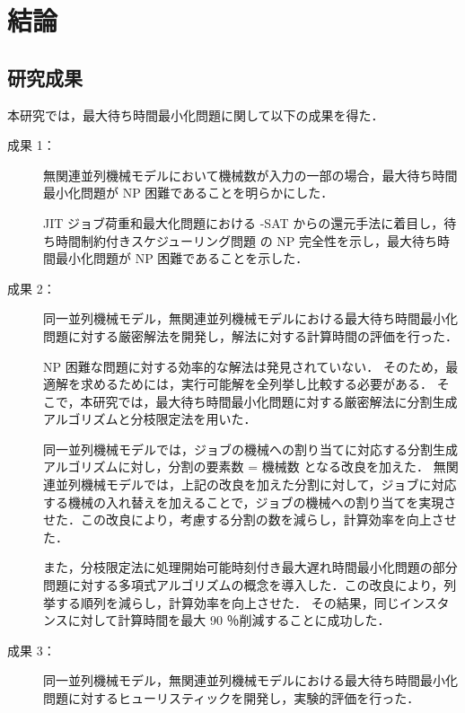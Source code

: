 \documentclass[12pt]{optlab-bachelor}
\begin{document}

\chapter{結論}\label{c_6}
\section{研究成果}
本研究では，最大待ち時間最小化問題に関して以下の成果を得た．
\begin{description}
  \item[成果 1：]
  無関連並列機械モデルにおいて機械数が入力の一部の場合，最大待ち時間最小化問題が NP 困難であることを明らかにした．

  JIT ジョブ荷重和最大化問題における {-SAT} からの還元手法に着目し，待ち時間制約付きスケジューリング問題 の NP 完全性を示し，最大待ち時間最小化問題が NP 困難であることを示した．

  \item[成果 2：]
  同一並列機械モデル，無関連並列機械モデルにおける最大待ち時間最小化問題に対する厳密解法を開発し，解法に対する計算時間の評価を行った．

  NP 困難な問題に対する効率的な解法は発見されていない．
  そのため，最適解を求めるためには，実行可能解を全列挙し比較する必要がある．
  そこで，本研究では，最大待ち時間最小化問題に対する厳密解法に分割生成アルゴリズムと分枝限定法を用いた．

  同一並列機械モデルでは，ジョブの機械への割り当てに対応する分割生成アルゴリズムに対し，分割の要素数 = 機械数 となる改良を加えた．
  無関連並列機械モデルでは，上記の改良を加えた分割に対して，ジョブに対応する機械の入れ替えを加えることで，ジョブの機械への割り当てを実現させた．この改良により，考慮する分割の数を減らし，計算効率を向上させた．

  また，分枝限定法に処理開始可能時刻付き最大遅れ時間最小化問題の部分問題に対する多項式アルゴリズムの概念を導入した．この改良により，列挙する順列を減らし，計算効率を向上させた．
  その結果，同じインスタンスに対して計算時間を最大 90 ％削減することに成功した．

  \item[成果 3：]
  同一並列機械モデル，無関連並列機械モデルにおける最大待ち時間最小化問題に対するヒューリスティックを開発し，実験的評価を行った．


\end{description}
\end{document}
